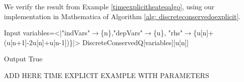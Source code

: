 \documentclass[runningheads]{llncs}
\newcommand{\1}{\chi}
\begin{document}
\begin{example}
	\label{heatex1}
	We verify the result from Example \ref{timeexplicitheateqalgo}, using our implementation in {\sc Mathematica} of Algorithm \ref{alg: discreteconservedqexplicit}.
	
	\begin{small}
		\begin{mmaCell}[moredefined={variables, expression, DiscreteConservedQ}]{Input}
  variables=<|"indVars"\(\pmb{\to}\)\{n\},"depVars"\(\pmb{\to}\)\{u\},
  "rhs"\(\pmb{\to}\)\{u[n]+(u[n+1]-2u[n]+u[n-1])\}|>
  DiscreteConservedQ[variables][u[n]]
  
\end{mmaCell}
		\begin{mmaCell}{Output}
  True
\end{mmaCell}
	\end{small}
\end{example}

{\color{red}ADD HERE TIME EXPLICIT EXAMPLE WITH PARAMETERS} 
\end{document}
